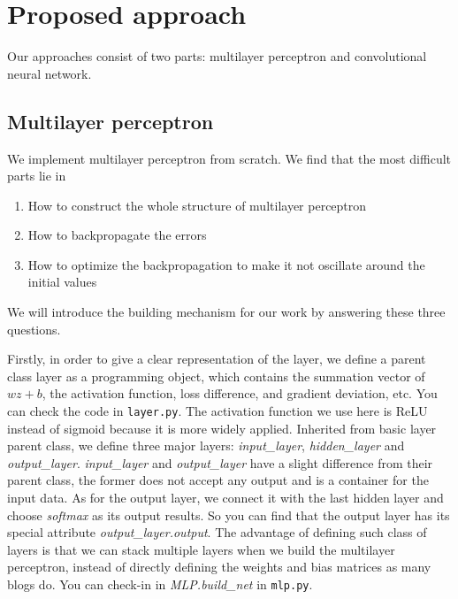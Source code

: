 \documentclass[11pt]{scrartcl}
\begin{document}
\section{Proposed approach}
Our approaches consist of two parts: multilayer perceptron and convolutional neural network.
\subsection{Multilayer perceptron}
We implement multilayer perceptron from scratch. We find that the most difficult parts lie in
\begin{enumerate}[(1)]
	\item How to construct the whole structure of multilayer perceptron
	\item How to backpropagate the errors
	\item How to optimize the backpropagation to make it not oscillate around the initial values
\end{enumerate}
We will introduce the building mechanism for our work by answering these three questions.

Firstly, in order to give a clear representation of the layer, we define a parent class layer as a programming object, which contains the summation vector of $wz+b$, the activation function, loss difference, and gradient deviation, etc. You can check the code in \texttt{layer.py}. The activation function we use here is ReLU instead of sigmoid because it is more widely applied. Inherited from basic layer parent class, we define three major layers: \textit{input\_layer}, \textit{hidden\_layer} and \textit{output\_layer}. \textit{input\_layer} and \textit{output\_layer} have a slight difference from their parent class, the former does not accept any output and is a container for the input data. As for the output layer, we connect it with the last hidden layer and choose \textit{softmax} as its output results. So you can find that the output layer has its special attribute \textit{output\_layer.output}. The advantage of defining such class of layers is that we can stack multiple layers when we build the multilayer perceptron, instead of directly defining the weights and bias matrices as many blogs do. You can check-in in \textit{MLP.build\_net} in \texttt{mlp.py}.
\end{document}
